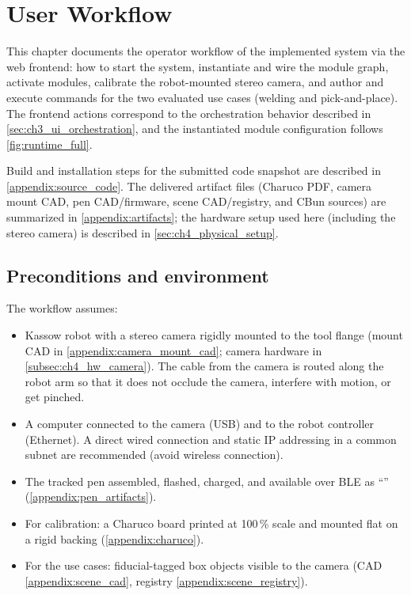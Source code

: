 \chapter{User Workflow}
\label{chapter:ch5_user_workflow}

This chapter documents the operator workflow of the implemented system via the web frontend: how to start the system, instantiate and wire the module graph, activate modules, calibrate the robot-mounted stereo camera, and author and execute commands for the two evaluated use cases (welding and pick-and-place).
The frontend actions correspond to the orchestration behavior described in \autoref{sec:ch3_ui_orchestration}, and the instantiated module configuration follows \autoref{fig:runtime_full}.

Build and installation steps for the submitted code snapshot are described in \autoref{appendix:source_code}.
The delivered artifact files (Charuco PDF, camera mount CAD, pen CAD/firmware, scene CAD/registry, and CBun sources) are summarized in \autoref{appendix:artifacts};
the hardware setup used here (including the stereo camera) is described in \autoref{sec:ch4_physical_setup}.




\section{Preconditions and environment}
\label{sec:ch5_preconditions}

The workflow assumes:
\begin{itemize}
  \item Kassow robot with a stereo camera rigidly mounted to the tool flange (mount CAD in \autoref{appendix:camera_mount_cad}; camera hardware in \autoref{subsec:ch4_hw_camera}).
        The cable from the camera is routed along the robot arm so that it does not occlude the camera, interfere with motion, or get pinched.
  \item A computer connected to the camera (USB) and to the robot controller (Ethernet). A direct wired connection and static IP addressing in a common subnet are recommended (avoid wireless connection).
  \item The tracked pen assembled, flashed, charged, and available over BLE as ``'' (\autoref{appendix:pen_artifacts}).
  \item For calibration: a Charuco board printed at 100\,\% scale and mounted flat on a rigid backing (\autoref{appendix:charuco}).
  \item For the use cases: fiducial-tagged box objects visible to the camera (CAD \autoref{appendix:scene_cad}, registry \autoref{appendix:scene_registry}).
\end{itemize}


